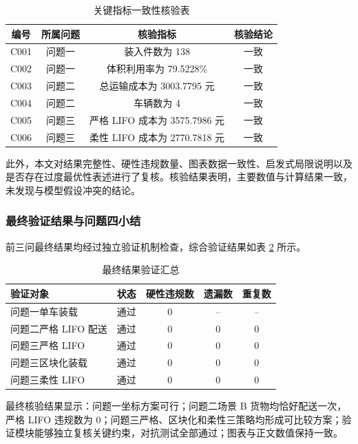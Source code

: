 ﻿\documentclass[UTF8,a4paper,12pt]{ctexart}
\newcommand{\paperbold}{\CJKfontspec[AutoFakeBold=4]{SimSun}\bfseries}
\newcommand{\modelsubpoint}[1]{\vspace{0.35em}\noindent{\paperbold #1}\par\vspace{0.12em}}
\begin{document}
	\begin{table}[H]
		\centering
		\caption{关键指标一致性核验表}
		\label{tab:q4_traceability}
		\begin{tabular}{c c c c}
			\toprule
			编号 & 所属问题 & 核验指标 & 核验结论 \\
			\midrule
			C001 & 问题一 & 装入件数为 138 & 一致 \\
			C002 & 问题一 & 体积利用率为 79.5228\% & 一致 \\
			C003 & 问题二 & 总运输成本为 3003.7795 元 & 一致 \\
			C004 & 问题二 & 车辆数为 4 & 一致 \\
			C005 & 问题三 & 严格 LIFO 成本为 3575.7986 元 & 一致 \\
			C006 & 问题三 & 柔性 LIFO 成本为 2770.7818 元 & 一致 \\
			\bottomrule
		\end{tabular}
	\end{table}
	
	此外，本文对结果完整性、硬性违规数量、图表数据一致性、启发式局限说明以及是否存在过度最优性表述进行了复核。核验结果表明，主要数值与计算结果一致，未发现与模型假设冲突的结论。
	
	\subsubsection{最终验证结果与问题四小结}
	
	\modelsubpoint{四个问题验证汇总}
	
	前三问最终结果均经过独立验证机制检查，综合验证结果如表 \ref{tab:q4_validation_summary} 所示。
	
	\begin{table}[H]
		\centering
		\caption{最终结果验证汇总}
		\label{tab:q4_validation_summary}
		\begin{tabular}{l c c c c}
			\toprule
			验证对象 & 状态 & 硬性违规数 & 遗漏数 & 重复数 \\
			\midrule
			问题一单车装载 & 通过 & 0 & -- & -- \\
			问题二严格 LIFO 配送 & 通过 & 0 & 0 & 0 \\
			问题三严格 LIFO & 通过 & 0 & 0 & 0 \\
			问题三区块化装载 & 通过 & 0 & 0 & 0 \\
			问题三柔性 LIFO & 通过 & 0 & 0 & 0 \\
			\bottomrule
		\end{tabular}
	\end{table}
	
	最终核验结果显示：问题一坐标方案可行；问题二场景 B 货物均恰好配送一次，严格 LIFO 违规数为 0；问题三严格、区块化和柔性三策略均形成可比较方案；验证模块能够独立复核关键约束，对抗测试全部通过；图表与正文数值保持一致。
	
\end{document}
